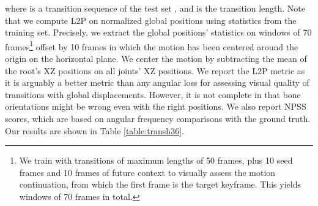 \documentclass[acmtog]{acmart}
\begin{document}
where  is a transition sequence of the test set , and  is the transition length. Note that we compute L2P on normalized global positions using statistics from the training set. Precisely, we extract the global positions' statistics on windows of 70 frames\footnote{We train with transitions of maximum lengths of 50 frames, plus 10 seed frames and 10 frames of future context to visually assess the motion continuation, from which the first frame is the target keyframe. This yields windows of 70 frames in total.} offset by 10 frames in which the motion has been centered around the origin on the horizontal plane. We center the motion by subtracting the mean of the root's XZ positions on all joints' XZ positions. We report the L2P metric as it is arguably a better metric than any angular loss for assessing visual quality of transitions with global displacements. However, it is not complete in that bone orientations might be wrong even with the right positions. We also report NPSS scores, which are based on angular frequency comparisons with the ground truth. Our results are shown in Table \ref{table:transh36}.
\end{document}
